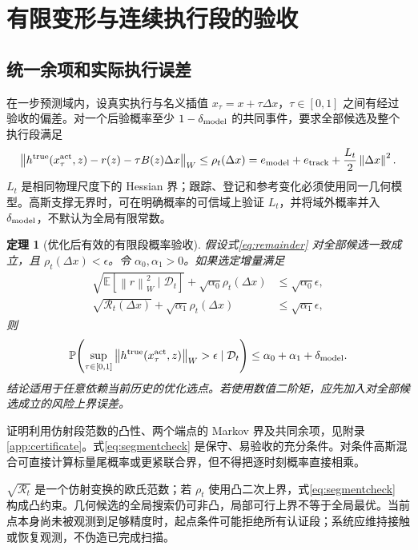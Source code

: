 \documentclass[UTF8,11pt,a4paper,fontset=fandol]{ctexart}
\numberwithin{equation}{section}
\newtheorem{theorem}{定理}[section]
\theoremstyle{definition}
\newcommand{\E}{\mathbb E}
\newcommand{\Prob}{\mathbb P}
\newcommand{\D}{\mathcal D}
\newcommand{\norm}[1]{\left\lVert#1\right\rVert}
\begin{document}
\section{有限变形与连续执行段的验收}
\label{sec:certificate}
\subsection{统一余项和实际执行误差}
在一步预测域内，设真实执行与名义插值
$x_\tau=x+\tau\Delta x$，$\tau\in[0,1]$ 之间有经过验收的偏差。对一个后验概率至少 $1-\delta_{\rm model}$ 的共同事件，要求全部候选及整个执行段满足
\begin{equation}
 \norm{h^{\rm true}(x^{\rm act}_\tau,z)-r(z)-\tau B(z)\Delta x}_W
 \le \rho_t(\Delta x)
 =e_{\rm model}+e_{\rm track}+\frac{L_t}{2}\norm{\Delta x}^{2}.
 \label{eq:remainder}
\end{equation}
$L_t$ 是相同物理尺度下的 Hessian 界；跟踪、登记和参考变化必须使用同一几何模型。高斯支撑无界时，可在明确概率的可信域上验证 $L_t$，并将域外概率并入 $\delta_{\rm model}$，不默认为全局有限常数。

\begin{theorem}[优化后有效的有限段概率验收]
\label{thm:segment}
假设式\eqref{eq:remainder} 对全部候选一致成立，且 $\rho_t(\Delta x)<\epsilon$。令 $\alpha_0,\alpha_1>0$。如果选定增量满足
\begin{align}
 \sqrt{\E[\norm{r}_W^2\mid\D_t]}+
       \sqrt{\alpha_0}\rho_t(\Delta x)&\le\sqrt{\alpha_0}\epsilon,\\
 \sqrt{\mathcal R_t(\Delta x)}+
       \sqrt{\alpha_1}\rho_t(\Delta x)&\le\sqrt{\alpha_1}\epsilon,
 \label{eq:segmentcheck}
\end{align}
则
\begin{equation}
 \Prob\!\left(\sup_{\tau\in[0,1]}
  \norm{h^{\rm true}(x^{\rm act}_\tau,z)}_W>\epsilon
       \mid\D_t\right)
 \le\alpha_0+\alpha_1+\delta_{\rm model}.
 \label{eq:segmentprob}
\end{equation}
结论适用于任意依赖当前历史的优化选点。若使用数值二阶矩，应先加入对全部候选成立的风险上界误差。
\end{theorem}

证明利用仿射段范数的凸性、两个端点的 Markov 界及共同余项，见附录\ref{app:certificate}。式\eqref{eq:segmentcheck} 是保守、易验收的充分条件。对条件高斯混合可直接计算标量尾概率或更紧联合界，但不得把逐时刻概率直接相乘。

$\sqrt{\mathcal R_t}$ 是一个仿射变换的欧氏范数；若 $\rho_t$ 使用凸二次上界，式\eqref{eq:segmentcheck} 构成凸约束。几何候选的全局搜索仍可非凸，局部可行上界不等于全局最优。当前点本身尚未被观测到足够精度时，起点条件可能拒绝所有认证段；系统应维持接触或恢复观测，不伪造已完成扫描。
\end{document}
